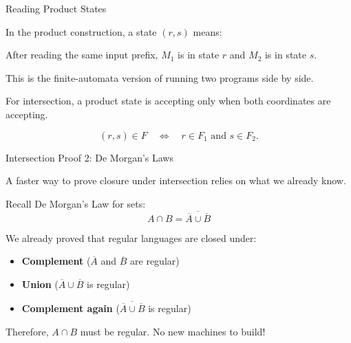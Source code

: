 \documentclass[10pt,aspectratio=169]{beamer}
\begin{document}
\begin{frame}{Reading Product States}

In the product construction, a state $(r,s)$ means:

\vspace{0.7em}
\begin{center}
After reading the same input prefix, $M_1$ is in state $r$ and $M_2$ is in state $s$.
\end{center}

\vspace{0.8em}
This is the finite-automata version of running two programs side by side.

\vspace{0.8em}
For intersection, a product state is accepting only when both coordinates are accepting.

\[
(r,s)\in F \quad \Longleftrightarrow \quad r\in F_1 \text{ and } s\in F_2.
\]

\end{frame}

\begin{frame}{Intersection Proof 2: De Morgan's Laws}

A faster way to prove closure under intersection relies on what we already know.

\vspace{1em}
Recall De Morgan's Law for sets:
\[
A \cap B = \overline{\overline{A} \cup \overline{B}}
\]

\vspace{1em}
\pause
We already proved that regular languages are closed under:
\begin{itemize}
    \item \textbf{Complement} ($\overline{A}$ and $\overline{B}$ are regular)
    \item \textbf{Union} ($\overline{A} \cup \overline{B}$ is regular)
    \item \textbf{Complement again} ($\overline{\overline{A} \cup \overline{B}}$ is regular)
\end{itemize}

\vspace{1em}
Therefore, $A \cap B$ must be regular. No new machines to build!

\end{frame}
\end{document}
